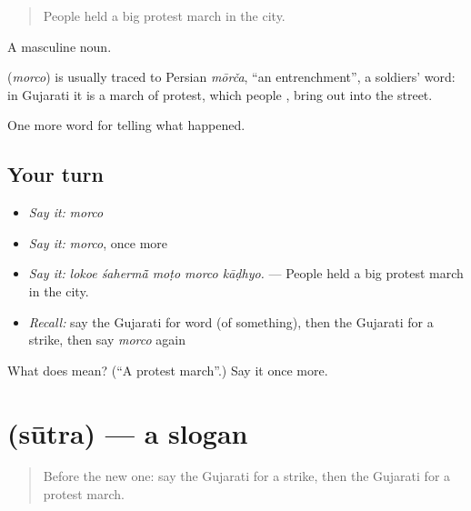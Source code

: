 \begin{quote}
People held a big protest march in the city.
\end{quote}

A masculine noun.

\begin{cousinweb}
\textbf{} (\emph{morco}) is usually traced to Persian \emph{mōrča}, \textquotedblleft{}an entrenchment\textquotedblright{}, a soldiers' word: in Gujarati it is a march of protest, which people \textbf{ }, bring out into the street.
\end{cousinweb}

\begin{grammarlens}[title={What you've built}]
One more word for telling what happened.
\end{grammarlens}

\subsection*{Your turn}
\begin{itemize}
\raggedright
  \item \emph{Say it:} \emph{morco}
  \item \emph{Say it:} \emph{morco}, once more
  \item \emph{Say it:} \emph{lokoe śahermā̃ moṭo morco kāḍhyo.} — People held a big protest march in the city.
  \item \emph{Recall:} say the Gujarati for word (of something), then the Gujarati for a strike, then say \emph{morco} again
\end{itemize}

\begin{tcolorbox}[breakable,colback=teal!4,colframe=teal!35!black,title={Before you move on}]
What does  mean? (\textquotedblleft{}A protest march\textquotedblright{}.) Say it once more.
\end{tcolorbox}
\section[\texorpdfstring{\gu{સૂત્ર} (sūtra)}{સૂત્ર (sūtra)}]{ (sūtra) — a slogan}

\label{lesson:GU-C314-sutra}



\begin{quote}
Before the new one: say the Gujarati for a strike, then the Gujarati for a protest march.
\end{quote}

